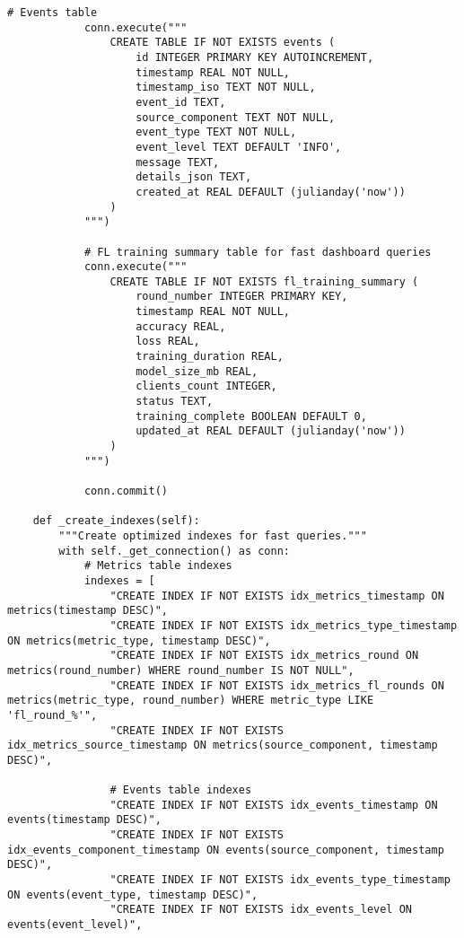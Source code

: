 \begin{lstlisting}[style=pythoncode, caption=Time Series Storage Implementation]
            # Events table
            conn.execute("""
                CREATE TABLE IF NOT EXISTS events (
                    id INTEGER PRIMARY KEY AUTOINCREMENT,
                    timestamp REAL NOT NULL,
                    timestamp_iso TEXT NOT NULL,
                    event_id TEXT,
                    source_component TEXT NOT NULL,
                    event_type TEXT NOT NULL,
                    event_level TEXT DEFAULT 'INFO',
                    message TEXT,
                    details_json TEXT,
                    created_at REAL DEFAULT (julianday('now'))
                )
            """)
            
            # FL training summary table for fast dashboard queries
            conn.execute("""
                CREATE TABLE IF NOT EXISTS fl_training_summary (
                    round_number INTEGER PRIMARY KEY,
                    timestamp REAL NOT NULL,
                    accuracy REAL,
                    loss REAL,
                    training_duration REAL,
                    model_size_mb REAL,
                    clients_count INTEGER,
                    status TEXT,
                    training_complete BOOLEAN DEFAULT 0,
                    updated_at REAL DEFAULT (julianday('now'))
                )
            """)
            
            conn.commit()

    def _create_indexes(self):
        """Create optimized indexes for fast queries."""
        with self._get_connection() as conn:
            # Metrics table indexes
            indexes = [
                "CREATE INDEX IF NOT EXISTS idx_metrics_timestamp ON metrics(timestamp DESC)",
                "CREATE INDEX IF NOT EXISTS idx_metrics_type_timestamp ON metrics(metric_type, timestamp DESC)",
                "CREATE INDEX IF NOT EXISTS idx_metrics_round ON metrics(round_number) WHERE round_number IS NOT NULL",
                "CREATE INDEX IF NOT EXISTS idx_metrics_fl_rounds ON metrics(metric_type, round_number) WHERE metric_type LIKE 'fl_round_%'",
                "CREATE INDEX IF NOT EXISTS idx_metrics_source_timestamp ON metrics(source_component, timestamp DESC)",
                
                # Events table indexes
                "CREATE INDEX IF NOT EXISTS idx_events_timestamp ON events(timestamp DESC)",
                "CREATE INDEX IF NOT EXISTS idx_events_component_timestamp ON events(source_component, timestamp DESC)",
                "CREATE INDEX IF NOT EXISTS idx_events_type_timestamp ON events(event_type, timestamp DESC)",
                "CREATE INDEX IF NOT EXISTS idx_events_level ON events(event_level)",
                

\end{lstlisting}
